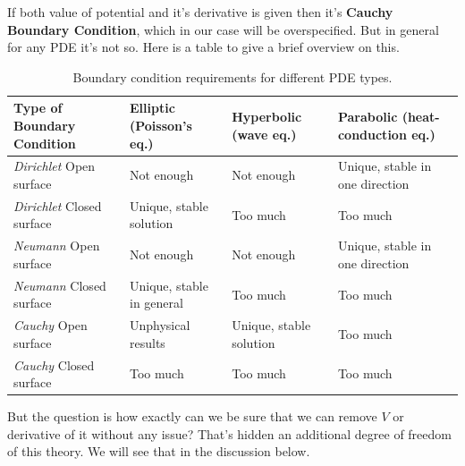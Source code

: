 \documentclass{article}
\begin{document}
\begin{note}
If both value of potential and it's derivative is given then it's \textbf{Cauchy Boundary Condition}, which in our case will be overspecified. But in general for any PDE it's not so. Here is a table to give a brief overview on this.
\begin{table}[H]
\centering
\small %
\renewcommand{\arraystretch}{1.4}
\setlength{\tabcolsep}{4pt} %
\begin{tabular}{|p{3.2cm}|p{3.5cm}|p{3.5cm}|p{5cm}|}
\hline
\textbf{Type of Boundary Condition} & 
\textbf{Elliptic (Poisson’s eq.)} & 
\textbf{Hyperbolic (wave eq.)} & 
\textbf{Parabolic (heat-conduction eq.)} \\
\hline
\textit{Dirichlet} Open surface & Not enough & Not enough & \colorbox{faintpink}{Unique, stable in one direction} \\
\hline
\textit{Dirichlet} Closed surface & \colorbox{faintpink}{Unique, stable solution} & Too much & Too much \\
\hline
\textit{Neumann} Open surface & Not enough & Not enough & \colorbox{faintpink}{Unique, stable in one direction} \\
\hline
\textit{Neumann} Closed surface & \colorbox{faintpink}{Unique, stable in general} & Too much & Too much \\
\hline
\textit{Cauchy} Open surface & Unphysical results & \colorbox{faintpink}{Unique, stable solution} & Too much \\
\hline
\textit{Cauchy} Closed surface & Too much & Too much & Too much \\
\hline
\end{tabular}
\caption{Boundary condition requirements for different PDE types.}
\label{tab:boundary_conditions}
\end{table}
\end{note}
But the question is how exactly can we be sure that we can remove $V$ or derivative of it without any issue? That's hidden an additional degree of freedom of this theory. We will see that in the discussion below.
\end{document}
